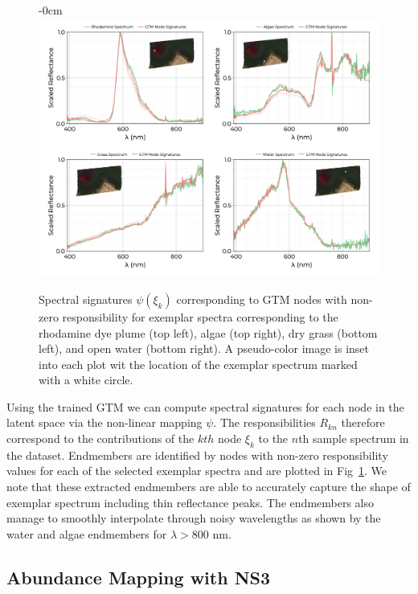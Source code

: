 \documentclass[remotesensing,article,submit,pdftex,moreauthors]{Definitions/mdpi}
\begin{document}
\begin{figure}[t]
\begin{adjustwidth}{-\extralength}{0cm}
\centering
\includegraphics[width=17.0cm]{paper/figures/results/spectral-signatures.png}
\end{adjustwidth}
\caption{Spectral signatures $\psi(\xi_k)$ corresponding to GTM nodes with non-zero responsibility for exemplar spectra corresponding to the rhodamine dye plume (top left), algae (top right), dry grass (bottom left), and open water (bottom right). A pseudo-color image is inset into each plot wit the location of the exemplar spectrum marked with a white circle. \label{fig:spectral-signatures}}
\end{figure}  

Using the trained GTM we can compute spectral signatures for each node in the latent space via the non-linear mapping $\psi$. The responsibilities $R_{kn}$ therefore correspond to the contributions of the $kth$ node $\xi_k$ to the $n$th sample spectrum in the dataset. Endmembers are identified by nodes with non-zero responsibility values for each of the selected exemplar spectra and are plotted in Fig~\ref{fig:spectral-signatures}. We note that these extracted endmembers are able to accurately capture the shape of exemplar spectrum including thin reflectance peaks. The endmembers also manage to smoothly interpolate through noisy wavelengths as shown by the water and algae endmembers for $\lambda > 800$ nm.

\subsection{Abundance Mapping with NS3}
\end{document}
